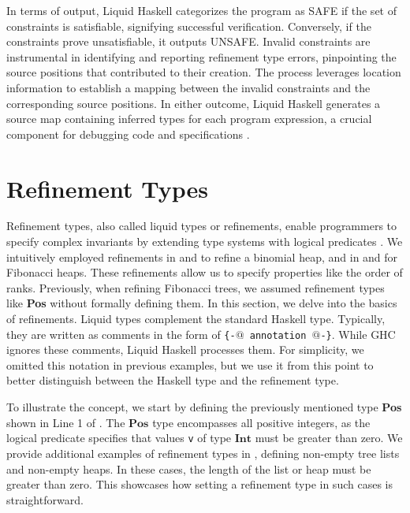\documentclass{clmthesis}
\begin{document}
In terms of output, Liquid Haskell categorizes the program as SAFE if the set of constraints is satisfiable, signifying successful verification. Conversely, if the constraints prove unsatisfiable, it outputs UNSAFE. Invalid constraints are instrumental in identifying and reporting refinement type errors, pinpointing the source positions that contributed to their creation. The process leverages location information to establish a mapping between the invalid constraints and the corresponding source positions. In either outcome, Liquid Haskell generates a source map containing inferred types for each program expression, a crucial component for debugging code and specifications \cite{vazou2014liquidhaskell}.

\FloatBarrier

\section{Refinement Types}\label{refinement}
Refinement types, also called liquid types or refinements, enable programmers to specify complex invariants by extending type systems with logical predicates \cite{vazou2014liquidhaskell}. We intuitively employed refinements in  and  to refine a binomial heap, and in  and  for Fibonacci heaps. These refinements allow us to specify properties like the order of ranks. Previously, when refining Fibonacci trees, we assumed refinement types like \textbf{Pos} without formally defining them. In this section, we delve into the basics of refinements.
Liquid types complement the standard Haskell type. Typically, they are written as comments in the form of \texttt{\{-$@$ annotation $@$-\}}. While GHC ignores these comments, Liquid Haskell processes them. For simplicity, we omitted this notation in previous examples, but we use it from this point to better distinguish between the Haskell type and the refinement type.

To illustrate the concept, we start by defining the previously mentioned type \textbf{Pos} shown in Line 1 of . The $\textbf{Pos}$ type encompasses all positive integers, as the logical predicate specifies that values \texttt{v} of type $\textbf{Int}$ must be greater than zero. We provide additional examples of refinement types in , defining non-empty tree lists and non-empty heaps. In these cases, the length of the list or heap must be greater than zero. This showcases how setting a refinement type in such cases is straightforward.
\end{document}
